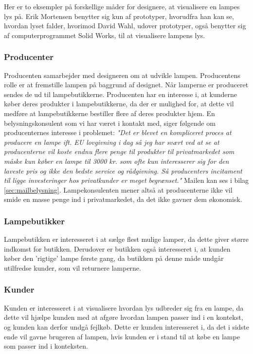 Her er to eksempler på forskellige måder for designere, at visualisere en lampes lys på. Erik Mortensen benytter sig kun af prototyper, hvorudfra han kan se, hvordan lyset falder, hvorimod David Wahl, udover prototyper, også benytter sig af computerprogrammet Solid Works, til at visualisere lampens lys. 

\subsubsection{Producenter}
Producenten samarbejder med designeren om at udvikle lampen. Producentens rolle er at fremstille lampen på baggrund af designet. Når lamperne er produceret sendes de ud til lampebutikkerne. Producenten har en interesse i, at kunderne køber deres produkter i lampebutikkerne, da der er mulighed for, at dette vil medføre at lampebutikkerne bestiller flere af deres produkter hjem. En belysningskonsulent som vi har været i kontakt med, siger følgende om producenternes interesse i problemet: \textit{"Det er blevet en kompliceret proces at producere en lampe ift. EU lovgivning i dag så jeg har svært ved at se at producenterne vil koste endnu flere penge til produkter til privatmarkedet som måske kun køber en lampe til 3000 kr. som ofte kun interesserer sig for den laveste pris og ikke den bedste service og rådgivning. Så producenters incitament til ligge investeringer hos privatkunder er meget begrænset."} Mailen kan ses i bilag \ref{sec:mailbelysning}. Lampekonsulenten mener altså at producenterne ikke vil smide en masse penge ind i privatmarkedet, da det ikke gavner dem økonomisk. 

\subsubsection{Lampebutikker}
Lampebutikken er interesseret i at sælge flest mulige lamper, da dette giver større indkomst for butikken. Derudover er butikken også interesseret i, at kunden køber den 'rigtige' lampe første gang, da butikken på denne måde undgår utilfredse kunder, som vil returnere lamperne.

\subsubsection{Kunder}
Kunden er interesseret i at visualisere hvordan lys udbreder sig fra en lampe, da dette vil hjælpe kunden med at afgøre hvordan lampen passer ind i en kontekst, og kunden kan derfor undgå fejlkøb. Dette er kunden interesseret i, da det i sidste ende vil gavne brugeren af lampen, hvis kunden er i stand til at købe en lampe som passer ind i konteksten.

